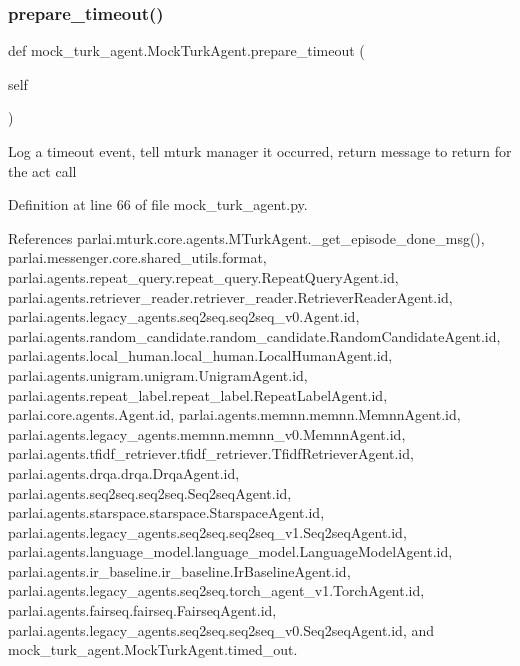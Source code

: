\subsubsection{\texorpdfstring{prepare\+\_\+timeout()}{prepare\_timeout()}}
{\footnotesize\ttfamily def mock\+\_\+turk\+\_\+agent.\+Mock\+Turk\+Agent.\+prepare\+\_\+timeout (\begin{DoxyParamCaption}\item[{}]{self }\end{DoxyParamCaption})}

\begin{DoxyVerb}Log a timeout event, tell mturk manager it occurred, return message
to return for the act call
\end{DoxyVerb}
 

Definition at line 66 of file mock\+\_\+turk\+\_\+agent.\+py.



References parlai.\+mturk.\+core.\+agents.\+M\+Turk\+Agent.\+\_\+get\+\_\+episode\+\_\+done\+\_\+msg(), parlai.\+messenger.\+core.\+shared\+\_\+utils.\+format, parlai.\+agents.\+repeat\+\_\+query.\+repeat\+\_\+query.\+Repeat\+Query\+Agent.\+id, parlai.\+agents.\+retriever\+\_\+reader.\+retriever\+\_\+reader.\+Retriever\+Reader\+Agent.\+id, parlai.\+agents.\+legacy\+\_\+agents.\+seq2seq.\+seq2seq\+\_\+v0.\+Agent.\+id, parlai.\+agents.\+random\+\_\+candidate.\+random\+\_\+candidate.\+Random\+Candidate\+Agent.\+id, parlai.\+agents.\+local\+\_\+human.\+local\+\_\+human.\+Local\+Human\+Agent.\+id, parlai.\+agents.\+unigram.\+unigram.\+Unigram\+Agent.\+id, parlai.\+agents.\+repeat\+\_\+label.\+repeat\+\_\+label.\+Repeat\+Label\+Agent.\+id, parlai.\+core.\+agents.\+Agent.\+id, parlai.\+agents.\+memnn.\+memnn.\+Memnn\+Agent.\+id, parlai.\+agents.\+legacy\+\_\+agents.\+memnn.\+memnn\+\_\+v0.\+Memnn\+Agent.\+id, parlai.\+agents.\+tfidf\+\_\+retriever.\+tfidf\+\_\+retriever.\+Tfidf\+Retriever\+Agent.\+id, parlai.\+agents.\+drqa.\+drqa.\+Drqa\+Agent.\+id, parlai.\+agents.\+seq2seq.\+seq2seq.\+Seq2seq\+Agent.\+id, parlai.\+agents.\+starspace.\+starspace.\+Starspace\+Agent.\+id, parlai.\+agents.\+legacy\+\_\+agents.\+seq2seq.\+seq2seq\+\_\+v1.\+Seq2seq\+Agent.\+id, parlai.\+agents.\+language\+\_\+model.\+language\+\_\+model.\+Language\+Model\+Agent.\+id, parlai.\+agents.\+ir\+\_\+baseline.\+ir\+\_\+baseline.\+Ir\+Baseline\+Agent.\+id, parlai.\+agents.\+legacy\+\_\+agents.\+seq2seq.\+torch\+\_\+agent\+\_\+v1.\+Torch\+Agent.\+id, parlai.\+agents.\+fairseq.\+fairseq.\+Fairseq\+Agent.\+id, parlai.\+agents.\+legacy\+\_\+agents.\+seq2seq.\+seq2seq\+\_\+v0.\+Seq2seq\+Agent.\+id, and mock\+\_\+turk\+\_\+agent.\+Mock\+Turk\+Agent.\+timed\+\_\+out.

